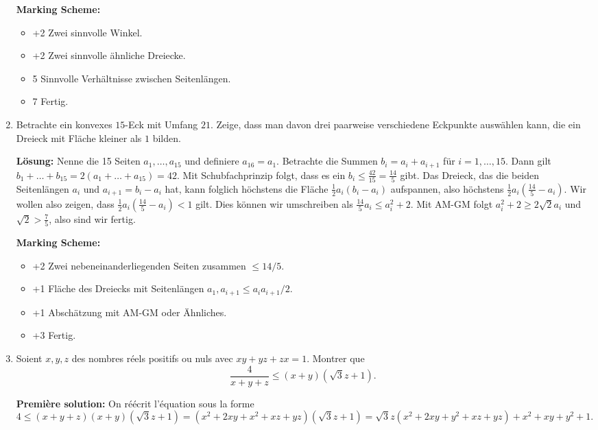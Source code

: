 \documentclass[language=german,style=solution]{smo}
\begin{document}
\begin{enumerate}[label=\textbf{\arabic*.}]
\textbf{Marking Scheme:}
\begin{itemize}
	\item +2 Zwei sinnvolle Winkel.
	\item +2 Zwei sinnvolle ähnliche Dreiecke.
	\item 5 Sinnvolle Verhältnisse zwischen Seitenlängen.
	\item 7 Fertig.
\end{itemize}

\newpage

\item Betrachte ein konvexes $15$-Eck mit Umfang $21$. Zeige, dass man davon drei paarweise verschiedene Eckpunkte auswählen kann, die ein Dreieck mit Fläche kleiner als $1$ bilden.

\textbf{Lösung:} Nenne die 15 Seiten $a_1,\ldots, a_{15}$ und definiere $a_{16} = a_1$. Betrachte die Summen $b_i=a_i+a_{i+1}$ für $i=1,\ldots,15$. Dann gilt $b_1+\ldots+b_{15}=2(a_1+\ldots+a_{15})=42$. Mit Schubfachprinzip folgt, dass es ein $b_i\leq \frac{42}{15}=\frac{14}{5}$ gibt. Das Dreieck, das die beiden Seitenlängen $a_i$ und $a_{i+1}=b_i-a_i$ hat, kann folglich höchstens die Fläche $\frac{1}{2}a_i(b_i-a_i)$ aufspannen, also höchstens $\frac{1}{2}a_i(\frac{14}{5}-a_i)$. Wir wollen also zeigen, dass $\frac{1}{2}a_i(\frac{14}{5}-a_i) < 1$ gilt. Dies können wir umschreiben als $\frac{14}{5}a_i\leq a_i^2+2$.  Mit AM-GM folgt $a_i^2+2\geq 2\sqrt{2}a_i$ und $\sqrt{2}>\frac{7}{5}$, also sind wir fertig.

\textbf{Marking Scheme:}
\begin{itemize}
	\item +2 Zwei nebeneinanderliegenden Seiten zusammen $\leq 14/5$.
	\item +1 Fläche des Dreiecks mit Seitenlängen $a_1, a_{i+1} \leq a_ia_{i+1}/2$.
	\item +1 Abschätzung mit AM-GM oder Ähnliches.
	\item +3 Fertig.
\end{itemize}

\newpage

\item Soient $x,y,z$ des nombres réels positifs ou nuls avec $xy + yz + zx = 1$. Montrer que
\[
\frac{4}{x+y+z} \leq (x + y)(\sqrt{3}z + 1).
\]

\textbf{Première solution:}
On réécrit l'équation sous la forme
\[
	4 \leq (x+y+z)(x+y)(\sqrt{3}z+1) = (x^2 + 2xy + x^2 + xz + yz)(\sqrt{3}z +1) = \sqrt{3}z(x^2 + 2xy + y^2 + xz + yz) + x^2 + xy + y^2 + 1.
\]


\end{enumerate}
\end{document}
